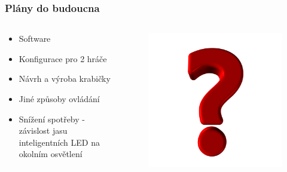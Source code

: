\documentclass[%
  12pt,       				%
	t,                  %
	aspectratio=1610,   %
	unicode,						%
]{beamer}				    	%
\begin{document}
\begin{frame} 
	\frametitle{Plány do budoucna}
	\begin{columns}[T] 								%
		\begin{column}{0.4\textwidth}		%
			\vspace{0.5cm}
			\begin{itemize}
				\item Software
				\item Konfigurace pro 2 hráče
				\item Návrh a výroba krabičky
				\item Jiné způsoby ovládání
				\item Snížení spotřeby - závislost jasu inteligentních LED na okolním osvětlení
			\end{itemize}
		\end{column}
		\begin{column}{0.6\textwidth}		%
			\begin{figure}%
				\centering
				\includegraphics[width=0.7\columnwidth]{obrazky/otaznik.png}
			\end{figure}
		\end{column}
	\end{columns}	
\end{frame}
\end{document}
